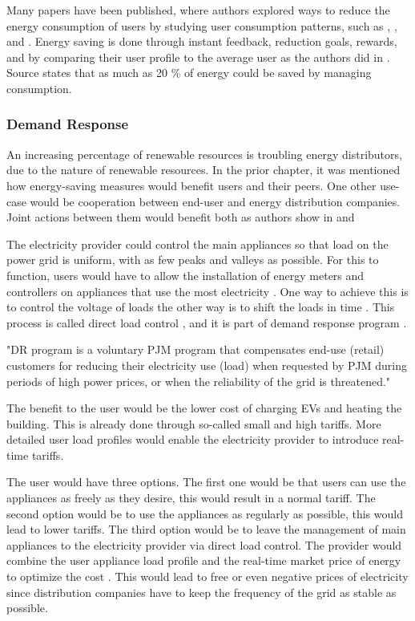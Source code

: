 Many papers have been published, where authors explored ways to reduce the energy consumption of users by studying user consumption patterns,
such as \cite{energy_saving3}, \cite{energy_saving1}, \cite{energy_saving4} and \cite{energy_saving3}.
Energy saving is done through instant feedback, reduction goals, rewards, and by comparing their user profile to the average user as the authors did in \cite{Csoknyai2019}.
Source \cite{eu2006} states that as much as 20 \% of energy could be saved by managing consumption.

\subsubsection{Demand Response}

An increasing percentage of renewable resources is troubling energy distributors, due to the nature of renewable resources.
In the prior chapter, it was mentioned how energy-saving measures would benefit users and their peers.
One other use-case would be cooperation between end-user and energy distribution companies.
Joint actions between them would benefit both as authors show in \cite{cooperation2008} and \cite{cooperation2010}

The electricity provider could control the main appliances so that load on the power grid is uniform,
with as few peaks and valleys as possible. For this to function, users would have to allow the installation of energy meters and controllers 
on appliances that use the most electricity \cite{gridDirectControll2015}. One way to achieve this is to control the voltage of loads \cite{controll2014} the other
way is to shift the loads in time \cite{shift2015}.
This process is called direct load control \cite{DirectLoadControll2021}, and it is part of demand response program \cite{DemandResponse2018}.

"DR program is a voluntary PJM program that compensates end-use (retail) customers for reducing their electricity use (load)
when requested by PJM during periods of high power prices, or when the reliability of the grid is threatened." \cite{DemandResponse2018}

The benefit to the user would be the lower cost of charging EVs and heating the building.
This is already done through so-called small and high tariffs.
More detailed user load profiles would enable the electricity provider to introduce real-time tariffs.

The user would have three options. The first one would be that users can use the appliances as freely as they desire, this would result in a normal tariff.
The second option would be to use the appliances as regularly as possible, this would lead to lower tariffs.
The third option would be to leave the management of main appliances to the electricity provider via direct load control.
The provider would combine the user appliance load profile and the real-time market price of energy to optimize the cost \cite{optimiseCostShift2015}.
This would lead to free or even negative prices of electricity since distribution companies have to keep the frequency of the grid as stable as possible.

